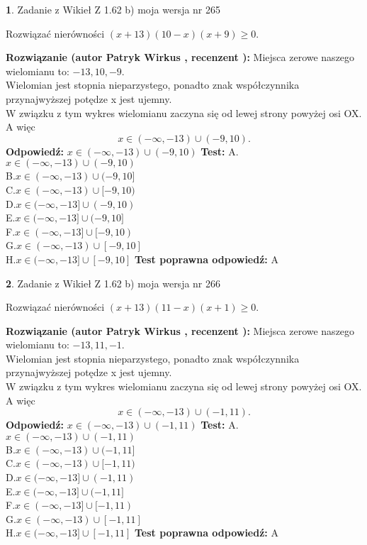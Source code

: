 \documentclass[12pt, a4paper]{article}
\theoremstyle{definition} %
\newtheorem{zad}{}
\newcommand{\zadStart}[1]{\begin{zad}#1\newline}
\newcommand{\zadStop}{\end{zad}}
\newcommand{\rozwStart}[2]{\noindent \textbf{Rozwiązanie (autor #1 , recenzent #2): }\newline}
\newcommand{\rozwStop}{\newline}
\newcommand{\odpStart}{\noindent \textbf{Odpowiedź:}\newline}
\newcommand{\odpStop}{\newline}
\newcommand{\testStart}{\noindent \textbf{Test:}\newline}
\newcommand{\testStop}{\newline}
\newcommand{\kluczStart}{\noindent \textbf{Test poprawna odpowiedź:}\newline}
\newcommand{\kluczStop}{\newline}
\begin{document}
\zadStart{Zadanie z Wikieł Z 1.62 b) moja wersja nr 265}

Rozwiązać nierówności $(x+13)(10-x)(x+9)\ge0$.
\zadStop
\rozwStart{Patryk Wirkus}{}
Miejsca zerowe naszego wielomianu to: $-13, 10, -9$.\\
Wielomian jest stopnia nieparzystego, ponadto znak współczynnika przy\linebreak najwyższej potędze x jest ujemny.\\ W związku z tym wykres wielomianu zaczyna się od lewej strony powyżej osi OX. A więc $$x \in (-\infty,-13) \cup (-9,10).$$
\rozwStop
\odpStart
$x \in (-\infty,-13) \cup (-9,10)$
\odpStop
\testStart
A.$x \in (-\infty,-13) \cup (-9,10)$\\
B.$x \in (-\infty,-13) \cup (-9,10]$\\
C.$x \in (-\infty,-13) \cup [-9,10)$\\
D.$x \in (-\infty,-13] \cup (-9,10)$\\
E.$x \in (-\infty,-13] \cup (-9,10]$\\
F.$x \in (-\infty,-13] \cup [-9,10)$\\
G.$x \in (-\infty,-13) \cup [-9,10]$\\
H.$x \in (-\infty,-13] \cup [-9,10]$
\testStop
\kluczStart
A
\kluczStop



\zadStart{Zadanie z Wikieł Z 1.62 b) moja wersja nr 266}

Rozwiązać nierówności $(x+13)(11-x)(x+1)\ge0$.
\zadStop
\rozwStart{Patryk Wirkus}{}
Miejsca zerowe naszego wielomianu to: $-13, 11, -1$.\\
Wielomian jest stopnia nieparzystego, ponadto znak współczynnika przy\linebreak najwyższej potędze x jest ujemny.\\ W związku z tym wykres wielomianu zaczyna się od lewej strony powyżej osi OX. A więc $$x \in (-\infty,-13) \cup (-1,11).$$
\rozwStop
\odpStart
$x \in (-\infty,-13) \cup (-1,11)$
\odpStop
\testStart
A.$x \in (-\infty,-13) \cup (-1,11)$\\
B.$x \in (-\infty,-13) \cup (-1,11]$\\
C.$x \in (-\infty,-13) \cup [-1,11)$\\
D.$x \in (-\infty,-13] \cup (-1,11)$\\
E.$x \in (-\infty,-13] \cup (-1,11]$\\
F.$x \in (-\infty,-13] \cup [-1,11)$\\
G.$x \in (-\infty,-13) \cup [-1,11]$\\
H.$x \in (-\infty,-13] \cup [-1,11]$
\testStop
\kluczStart
A
\kluczStop
\end{document}
